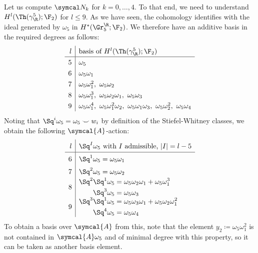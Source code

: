 \begin{example}
	Let us compute $\Bord_k$ for $k = 0, \ldots, 4$.
	To that end, we need to understand $H^l(\Th(\gamma_\R^5); \F_2)$ for $l \leq 9$.
	As we have seen, the cohomology identifies with the ideal generated by $\omega_5$ in $H^*(\Gr_5^\R; \F_2)$.
	We therefore have an additive basis in the required degrees as follows:
	\begin{equation*}
		\renewcommand{\arraystretch}{1.3}
		\begin{array}{r|l}
			l & \text{basis of } H^l(\Th(\gamma_\R^5); \F_2) \\ 
			\hline
			5 & \omega_5 \\
			6 & \omega_5 \omega_1 \\
			7 & \omega_5 \omega_1^2,\ \omega_5 \omega_2 \\
			8 & \omega_5 \omega_1^3,\ \omega_5 \omega_2 \omega_1,\ \omega_5 \omega_3 \\
			9 & \omega_5 \omega_1^4,\ \omega_5 \omega_1^2 \omega_2,\ \omega_5 \omega_1 \omega_3,\ \omega_5 \omega_2^2,\ \omega_5 \omega_4
		\end{array}
	\end{equation*}
	Noting that $\Sq^i \omega_5 = \omega_5 \smile w_i$ by definition of the Stiefel-Whitney classes, we obtain the following $\symcal{A}$-action:
	\begin{equation*}
		\renewcommand{\arraystretch}{1.5}
		\begin{array}{r|l}
			l & \Sq^I \omega_5 \text{ with } I \text{ admissible, } |I| = l - 5	\\
			\hline
			6 & \Sq^1 \omega_5 = \omega_5 \omega_1 \\
			7 & \Sq^2 \omega_5 = \omega_5 \omega_2 \\
			8 & \begin{aligned}
					\Sq^2 \Sq^1 \omega_5 &= \omega_5 \omega_2 \omega_1 + \omega_5 \omega_1^3 \\
					\Sq^3 \omega_5 &= \omega_5 \omega_3
			\end{aligned} \\
			9 & \begin{aligned}
					\Sq^3 \Sq^1 \omega_5 &= \omega_5 \omega_3 \omega_1 + \omega_5 \omega_2 \omega_1^2 \\
					\Sq^4 \omega_5 &= \omega_5 \omega_4
			\end{aligned}
		\end{array}
	\end{equation*}
	To obtain a basis over $\symcal{A}$ from this, note that the element $y_2 \coloneq \omega_5 \omega_1^2$ is not contained in $\symcal{A} \omega_5$ and of minimal degree with this property, so it can be taken as another basis element.

\end{example}
